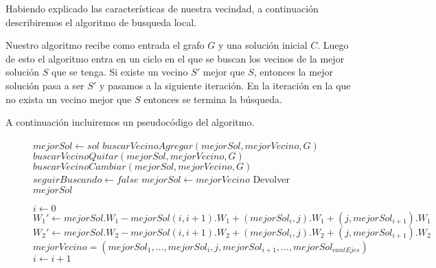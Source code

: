 Habiendo explicado las características de nuestra vecindad, a continuación describiremos el algoritmo de busqueda local.

Nuestro algoritmo recibe como entrada el grafo $G$ y una solución inicial $C$. Luego de esto el algoritmo entra en un ciclo en el que se buscan los vecinos de la mejor solución $S$ que se tenga. Si existe un vecino $S'$ mejor que $S$, entonces la mejor solución pasa a ser $S'$ y pasamos a la siguiente iteración. En la iteración en la que no exista un vecino mejor que $S$ entonces se termina la búsqueda.

A continuación incluiremos un pseudocódigo del algoritmo.
\begin{center}
 \begin{figure}[H]
  \begin{pseudo}
   \State $mejorSol \leftarrow sol$
      \State $buscarVecinoAgregar(mejorSol, mejorVecino, G)$
      \State $buscarVecinoQuitar(mejorSol, mejorVecino, G)$
      \State $buscarVecinoCambiar(mejorSol, mejorVecino, G)$
	\State $seguirBuscando \leftarrow false$
      \Else
	\State $mejorSol \leftarrow mejorVecino$
      \EndIf
   \EndWhile
   \State Devolver $mejorSol$
   \EndProcedure
  \end{pseudo}
 \end{figure}
\end{center}

\begin{flushleft}
 \begin{figure}[H]
  \begin{pseudo}
   \State $i \leftarrow 0$
	  \State $W_1' \leftarrow mejorSol.W_1 - mejorSol(i,i+1).W_1 + (mejorSol_i,j).W_1 +(j,mejorSol_{i+1}).W_1$
	  \State $W_2' \leftarrow mejorSol.W_2 - mejorSol(i,i+1).W_2 + (mejorSol_i,j).W_2 +(j,mejorSol_{i+1}).W_2$
	    \State $mejorVecino = (mejorSol_1, ... ,mejorSol_i, j, mejorSol_{i+1}, ..., mejorSol_{cantEjes})$
	  \EndIf
      \EndFor
      \State $i \leftarrow i+1$
   \EndWhile
   \EndProcedure
  \end{pseudo}
 \end{figure}
\end{flushleft}

